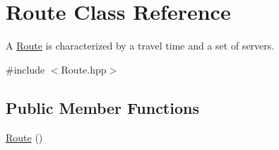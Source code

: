 \hypertarget{class_route}{\section{Route Class Reference}
\label{dd/d62/class_route}
}


A \hyperlink{class_route}{Route} is characterized by a travel time and a set of servers.  




{\ttfamily \#include $<$Route.\-hpp$>$}

\subsection*{Public Member Functions}
\begin{DoxyCompactItemize}
\item 
\hypertarget{class_route_a2b1c971aaf032109cee8081c97e9b9e9}{\hyperlink{class_route_a2b1c971aaf032109cee8081c97e9b9e9}{Route} ()}\label{dd/d62/class_route_a2b1c971aaf032109cee8081c97e9b9e9}


\end{DoxyCompactItemize}
